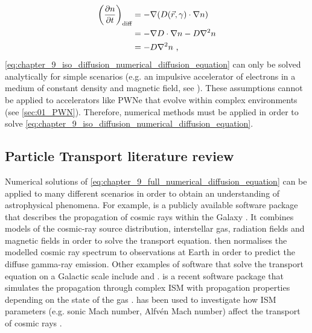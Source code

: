 \begin{equation}
    \begin{aligned}
    \qty(\pdv{n}{t})_\text{diff}&=-\nabla\qty(D\qty(\vec{r},\gamma)\cdot \nabla n)  \\
    &=-\nabla D\cdot \nabla n -D\nabla^2 n \\
    &=-D\nabla^2 n\text{ ,} 
    \end{aligned}
\end{equation}
\noindent \autoref{eq:chapter_9_iso_diffusion_numerical_diffusion_equation} can only be solved analytically for simple scenarios (e.g. an impulsive accelerator of electrons in a medium of constant density and magnetic field, see \cite{1995PhRvD..52.3265A}). These assumptions cannot be applied to accelerators like PWNe that evolve within complex environments (see \autoref{sec:01_PWN}). Therefore, numerical methods must be applied in order to solve \autoref{eq:chapter_9_iso_diffusion_numerical_diffusion_equation}.

\subsection{Particle Transport literature review}

Numerical solutions of \autoref{eq:chapter_9_full_numerical_diffusion_equation} can be applied to many different scenarios in order to obtain an understanding of astrophysical phenomena. For example, \galprop is a publicly available software package that describes the propagation of cosmic rays within the Galaxy \citep{2022ApJS..262...30P}. It combines models of the cosmic-ray source distribution, interstellar gas, radiation fields and magnetic fields in order to solve the transport equation. \galprop then normalises the modelled cosmic ray spectrum to observations at Earth in order to predict the diffuse gamma-ray emission. Other examples of software that solve the transport equation on a Galactic scale include \dragon \citep{2017JCAP...02..015E} and \picard \citep{2014APh....55...37K}. \criptic is a recent software package that simulates the propagation through complex ISM with propagation properties depending on the state of the gas \citep{2022MNRAS.517.1355K}. \criptic has been used to investigate how ISM parameters (e.g. sonic Mach number, Alfv\'en Mach number) affect the transport of cosmic rays \citep{2023MNRAS.519.1503S}.

